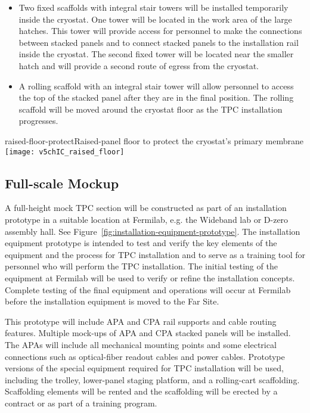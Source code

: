 \begin{itemize}
\item Two fixed scaffolds with integral stair towers will be installed temporarily inside the cryostat. One tower will be located in the work area of the large hatches. This tower will provide access for personnel to make the connections between stacked panels and to connect stacked panels to the installation rail inside the cryostat. The second fixed tower will be located near the smaller hatch and will provide a second route of egress from the cryostat. 
\item A rolling scaffold with an integral stair tower will allow personnel to access the top of the stacked panel after they are in the final position. The rolling scaffold will be moved around the cryostat floor as the TPC installation progresses. 
\end{itemize}

\begin{cdrfigure}{raised-floor-protect}{Raised-panel floor to protect the cryostat's primary membrane}
\texttt{[image: v5chIC\_raised\_floor]}
\end{cdrfigure}


\subsection{Full-scale Mockup}
\label{fd:install:tempeqp:fsmockup}

A full-height mock TPC section will be constructed as part of an installation prototype in a suitable location at Fermilab, e.g. the Wideband lab or D-zero assembly hall. See Figure~\ref{fig:installation-equipment-prototype}. 
The installation 
equipment prototype is intended to test and verify the key elements of the equipment and the process for TPC installation and to serve as a training tool for personnel who will perform the TPC installation. The initial testing of the equipment at Fermilab will be used to verify or refine the installation concepts. 
Complete testing of the final equipment and operations will occur at Fermilab before the installation equipment is moved to the Far Site. 

This prototype will include APA and CPA rail supports and cable routing features. Multiple mock-ups of APA and CPA stacked panels will be installed. The APAs will include all mechanical mounting points and 
some electrical connections such as optical-fiber readout cables and power cables. Prototype versions of the special equipment required for TPC installation will be used, including the trolley, lower-panel 
staging platform, and a rolling-cart scaffolding. Scaffolding elements will be rented and the scaffolding will be erected by a contract or as part of a training program. 

